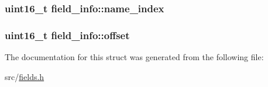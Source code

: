 \subsubsection[{\texorpdfstring{name\+\_\+index}{name_index}}]{\setlength{\rightskip}{0pt plus 5cm}uint16\+\_\+t field\+\_\+info\+::name\+\_\+index}\hypertarget{structfield__info_a3041f6a85347269c5253f7d377384b06}{}\label{structfield__info_a3041f6a85347269c5253f7d377384b06}
\subsubsection[{\texorpdfstring{offset}{offset}}]{\setlength{\rightskip}{0pt plus 5cm}uint16\+\_\+t field\+\_\+info\+::offset}\hypertarget{structfield__info_ad6febfc2078ae2a35339d57079a28b3d}{}\label{structfield__info_ad6febfc2078ae2a35339d57079a28b3d}


The documentation for this struct was generated from the following file\+:\begin{DoxyCompactItemize}
\item 
src/\hyperlink{fields_8h}{fields.\+h}\end{DoxyCompactItemize}
